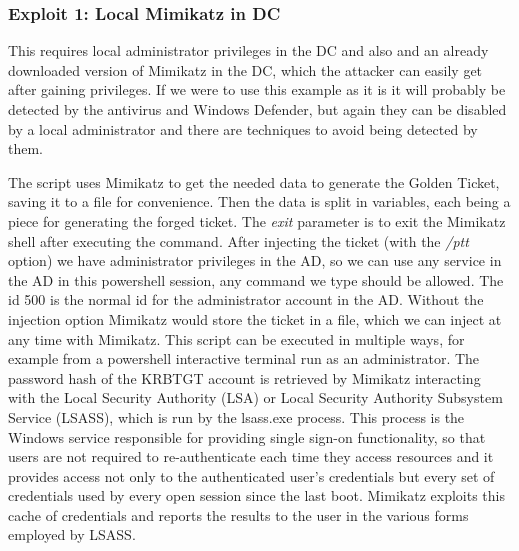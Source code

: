 \subsubsection{Exploit 1: Local Mimikatz in DC}
This requires local administrator privileges in the DC and also and an already downloaded version of Mimikatz in the DC, which the attacker can easily get after gaining privileges. If we were to use this example as it is it will probably be detected by the antivirus and Windows Defender, but again they can be disabled by a local administrator and there are techniques to avoid being detected by them.
\linej

\linej
The script uses Mimikatz to get the needed data to generate the Golden Ticket, saving it to a file for convenience. Then the data is split in variables, each being a piece for generating the forged ticket. The \textit{exit} parameter is to exit the Mimikatz shell after executing the command.
\linej
After injecting the ticket (with the \textit{/ptt} option) we have administrator privileges in the AD, so we can use any service in the AD in this powershell session, any command we type should be allowed. The id 500 is the normal id for the administrator account in the AD. Without the injection option Mimikatz would store the ticket in a file, which we can inject at any time with Mimikatz. This script can be executed in multiple ways, for example from a powershell interactive terminal run as an administrator.
\linej
\linej
The password hash of the KRBTGT account is retrieved by Mimikatz interacting with the Local Security Authority (LSA) or Local Security Authority Subsystem Service (LSASS), which is run by the lsass.exe process\cite{wikipedia_lsass}\cite{pentestlab}\cite{lsadump_patch_inject}\cite{dump_ways}.
\linej
This process is the Windows service responsible for providing single sign-on functionality, so that users are not required to re-authenticate each time they access resources and it provides access not only to the authenticated user's credentials but every set of credentials used by every open session since the last boot.
\linej
Mimikatz exploits this cache of credentials and reports the results to the user in the various forms employed by LSASS\cite{SANS_mimikatz}.

